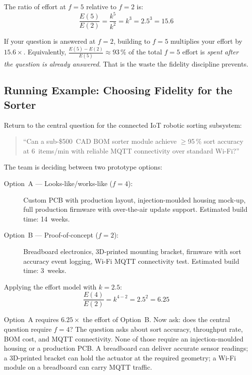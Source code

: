 The ratio of effort at $f=5$ relative to $f=2$ is:
\begin{equation}
  \label{eq:ch2-effort-ratio}
  \frac{E(5)}{E(2)} = \frac{k^5}{k^2} = k^3 = 2.5^3 = 15.6
\end{equation}

If your question is answered at $f=2$, building to $f=5$ multiplies your
effort by $15.6\times$.
Equivalently, $\frac{E(5) - E(2)}{E(5)} \approx 93\,\%$ of the total
$f=5$ effort is \emph{spent after the question is already answered}.
That is the waste the fidelity discipline prevents.

\subsection{Running Example: Choosing Fidelity for the Sorter}
\label{sec:ch2-sorter-fidelity}

Return to the central question for the connected IoT robotic sorting
subsystem:

\begin{quote}
  ``Can a sub-\$500~CAD BOM sorter module achieve $\geq$95\,\% sort accuracy
  at 6~items/min with reliable MQTT connectivity over standard Wi-Fi?''
\end{quote}

The team is deciding between two prototype options:

\begin{description}
  \item[Option~A --- Looks-like/works-like ($f=4$):]
    Custom PCB with production layout, injection-moulded housing mock-up,
    full production firmware with over-the-air update support.
    Estimated build time: 14~weeks.

  \item[Option~B --- Proof-of-concept ($f=2$):]
    Breadboard electronics, 3D-printed mounting bracket, firmware with sort
    accuracy event logging, Wi-Fi MQTT connectivity test.
    Estimated build time: 3~weeks.
\end{description}

Applying the effort model with $k=2.5$:
\begin{equation}
  \label{eq:ch2-sorter-ratio}
  \frac{E(4)}{E(2)} = k^{4-2} = 2.5^2 = 6.25
\end{equation}

Option~A requires $6.25\times$ the effort of Option~B.
Now ask: does the central question require $f=4$?
The question asks about sort accuracy, throughput rate, BOM cost, and MQTT
connectivity.
None of those require an injection-moulded housing or a production PCB.
A breadboard can deliver accurate sensor readings; a 3D-printed bracket can
hold the actuator at the required geometry; a Wi-Fi module on a breadboard
can carry MQTT traffic.

